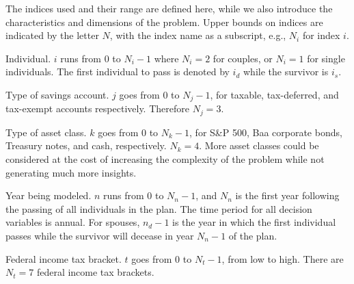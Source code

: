 \documentclass{report}[fleqn,12pt]
\begin{document}
The indices used and their range are defined here, while we also
introduce the characteristics and dimensions of the problem.
Upper bounds on indices are indicated by the letter $N$, with the
index name as a subscript, e.g., $N_i$ for index $i$.
\begin{description}[leftmargin=4em,style=multiline]
\item [$i$]
	Individual. $i$ runs from 0 to $N_i - 1$ where $N_i = 2$ for couples,
	or $N_i= 1$ for single individuals. The first individual to pass
		is denoted by $i_d$ while the survivor is $i_s$.
\item [$j$]
	Type of savings account. $j$ goes from 0 to $N_j - 1$, for taxable, tax-deferred,
	and tax-exempt accounts respectively. Therefore $N_j = 3$.
\item[$k$]
	Type of asset class. $k$ goes from 0 to $N_k -1 $, for S\&P 500,
	Baa corporate bonds, Treasury notes, and cash, respectively. $N_k = 4$.
	More asset classes could be considered at the cost of increasing
	the complexity of the problem while not generating much more insights.
\item [$n$]
	Year being modeled. $n$ runs from 0 to $N_n-1$, and $N_n$
	is the first year following the passing of all
	individuals in the plan. The time period for all decision variables is annual.
	For spouses, $n_d-1$ is the year in which the first individual passes while
	the survivor will decease in year $N_n-1$ of the plan.
\item [$t$]
	Federal income tax bracket. $t$ goes from 0 to $N_t - 1$, from low to high.
	There are $N_t = 7$ federal income tax brackets.
\end{description}
\end{document}

